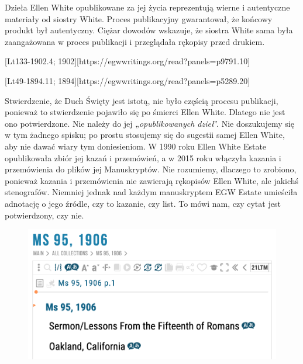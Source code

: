 Dzieła Ellen White opublikowane za jej życia reprezentują wierne i autentyczne materiały od siostry White. Proces publikacyjny gwarantował, że końcowy produkt był autentyczny. Ciężar dowodów wskazuje, że siostra White sama była zaangażowana w proces publikacji i przeglądała rękopisy przed drukiem.

[Lt133-1902.4; 1902][https://egwwritings.org/read?panels=p9791.10]

[Lt49-1894.11; 1894][https://egwwritings.org/read?panels=p5289.20]

Stwierdzenie, że Duch Święty jest istotą, nie było częścią procesu publikacji, ponieważ to stwierdzenie pojawiło się po śmierci Ellen White. Dlatego nie jest ono potwierdzone. Nie należy do jej „\textit{opublikowanych dzieł}”. Nie doszukujemy się w tym żadnego spisku; po prostu stosujemy się do sugestii samej Ellen White, aby nie dawać wiary tym doniesieniom. W 1990 roku Ellen White Estate opublikowała zbiór jej kazań i przemówień, a w 2015 roku włączyła kazania i przemówienia do plików jej Manuskryptów. Nie rozumiemy, dlaczego to zrobiono, ponieważ kazania i przemówienia nie zawierają rękopisów Ellen White, ale jakichś stenografów. Niemniej jednak nad każdym manuskryptem EGW Estate umieściła adnotację o jego źródle, czy to kazanie, czy list. To mówi nam, czy cytat jest potwierdzony, czy nie.

\begin{figure}
    \centering
    \includegraphics[width=1\linewidth]{images/sermons-and-talks.png}
    \label{fig:enter-label}
\end{figure}

